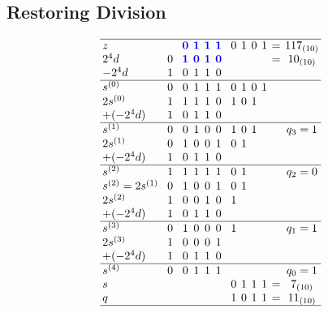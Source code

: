 \documentclass[a4paper,6pt]{article}
\begin{document}
\begin{multicols*}{3}
\subsection*{Restoring Division}

\[
\setlength\arraycolsep{2pt} %
\begin{array}{lcccccccccccccc}
\hline
z                   & &   & & \textcolor{blue}{\textbf{0}} & \textcolor{blue}{\textbf{1}} & \textcolor{blue}{\textbf{1}} & \textcolor{blue}{\textbf{1}} & & 0 & 1 & 0 & 1 & = & 117_{(10)}  \\
2^4 d               & & 0 & & \textcolor{blue}{\textbf{1}} & \textcolor{blue}{\textbf{0}} & \textcolor{blue}{\textbf{1}} & \textcolor{blue}{\textbf{0}} & &   &   &   &   & = & 10_{(10)} \\
-2^4 d              & & 1 & & 0 & 1 & 1 & 0 & &   &   &   &   &   &   \\
\hline
s^{(0)}             & & 0 & & 0 & 1 & 1 & 1 & & 0 & 1 & 0 & 1 &   &   \\
2s^{(0)}            & & 1 & & 1 & 1 & 1 & 0 & & 1 & 0 & 1 &   &   &   \\
+(-2^4d)            & & 1 & & 0 & 1 & 1 & 0 & &   &   &   &   &   &   \\
\hline
s^{(1)}             & & 0 & & 0 & 1 & 0 & 0 & & 1 & 0 & 1 &   &   & q_3 = 1 \\
2s^{(1)}            & & 0 & & 1 & 0 & 0 & 1 & & 0 & 1 &   &   &   &   \\
+(-2^4d)            & & 1 & & 0 & 1 & 1 & 0 & &   &   &   &   &   &   \\
\hline
s^{(2)}             & & 1 & & 1 & 1 & 1 & 1 & & 0 & 1 &   &   &   & q_2 = 0 \\
s^{(2)}=2s^{(1)}    & & 0 & & 1 & 0 & 0 & 1 & & 0 & 1 &   &   &   &   \\
2s^{(2)}            & & 1 & & 0 & 0 & 1 & 0 & & 1 &   &   &   &   &   \\
+(-2^4d)            & & 1 & & 0 & 1 & 1 & 0 & &   &   &   &   &   &   \\
\hline
s^{(3)}             & & 0 & & 1 & 0 & 0 & 0 & & 1 &   &   &   &   & q_1 = 1 \\
2s^{(3)}            & & 1 & & 0 & 0 & 0 & 1 & &   &   &   &   &   &   \\
+(-2^4d)            & & 1 & & 0 & 1 & 1 & 0 & &   &   &   &   &   &   \\
\hline
s^{(4)}             & & 0 & & 0 & 1 & 1 & 1 & &   &   &   &   &   & q_0 = 1 \\
s                   & &   & &   &   &   &   & & 0 & 1 & 1 & 1 & = & 7_{(10)}  \\
q                   & &   & &   &   &   &   & & 1 & 0 & 1 & 1 & = & 11_{(10)} \\
\hline
\end{array}
\]



\end{multicols*}
\end{document}
